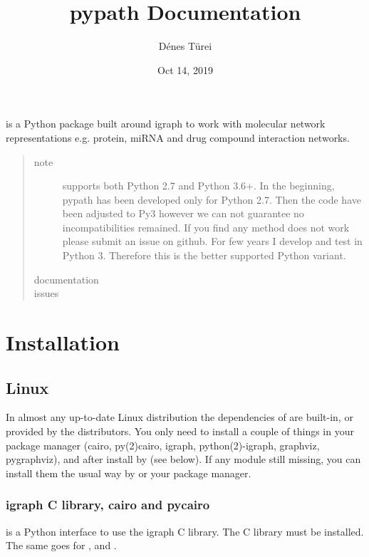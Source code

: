 \documentclass[letterpaper,10pt,english]{sphinxmanual}
\title{pypath Documentation}
\date{Oct 14, 2019}
\author{Dénes Türei}
\begin{document}
\pagestyle{empty}
\sphinxmaketitle
\pagestyle{plain}
\sphinxtableofcontents
\pagestyle{normal}
\label{\detokenize{index::doc}}


 is a Python package built around igraph to work with molecular
network representations e.g. protein, miRNA and drug compound interaction
networks.
\begin{quote}\begin{description}
\item[{note}] \leavevmode
{} supports both Python 2.7 and Python 3.6+. In the beginning,
pypath has been developed only for Python 2.7. Then the code have been
adjusted to Py3 however we can not guarantee no incompatibilities
remained. If you find any method does not work please submit an issue on
github. For few years I develop and test  in Python 3. Therefore
this is the better supported Python variant.

\item[{documentation}] \leavevmode
{}

\item[{issues}] \leavevmode
{}

\end{description}\end{quote}


\chapter{Installation}
\label{\detokenize{installation:installation}}\label{\detokenize{installation::doc}}

\section{Linux}
\label{\detokenize{installation:linux}}
In almost any up-to-date Linux distribution the dependencies of  are
built-in, or provided by the distributors. You only need to install a couple
of things in your package manager (cairo, py(2)cairo, igraph,
python(2)-igraph, graphviz, pygraphviz), and after install  by 
(see below). If any module still missing, you can install them the usual way
by  or your package manager.


\subsection{igraph C library, cairo and pycairo}
\label{\detokenize{installation:igraph-c-library-cairo-and-pycairo}}
 is a Python interface to use the igraph C library. The
C library must be installed. The same goes for ,  and
.
\end{document}
